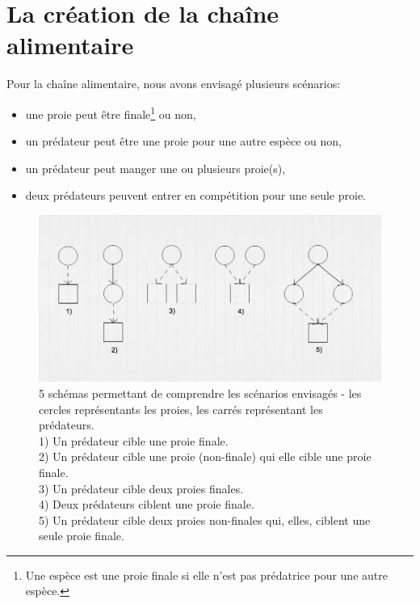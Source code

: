 \section{La création de la chaîne alimentaire}

Pour la chaîne alimentaire, nous avons envisagé plusieurs scénarios:
\begin{itemize}
\item{une proie peut être finale\footnote{Une espèce est une proie finale si elle n'est pas prédatrice pour une autre espèce.} ou non,}
\item{un prédateur peut être une proie pour une autre espèce ou non,}
\item{un prédateur peut manger une ou plusieurs proie(s),}
\item{deux prédateurs peuvent entrer en compétition pour une seule proie.}
\end{itemize}

\begin{figure}[h]
\begin{center}
\includegraphics[scale=0.465]{img/config_preypred_schema.png}
\end{center}
\caption{5 schémas permettant de comprendre les scénarios envisagés - les cercles représentants les proies, les carrés représentant les prédateurs.
\\
1) Un prédateur cible une proie finale.\\
2) Un prédateur cible une proie (non-finale) qui elle cible une proie finale.\\
3) Un prédateur cible deux proies finales.\\
4) Deux prédateurs ciblent une proie finale.\\
5) Un prédateur cible deux proies non-finales qui, elles, ciblent une seule proie finale.
}
\label{fig:config_preypred_schema}
\end{figure}

